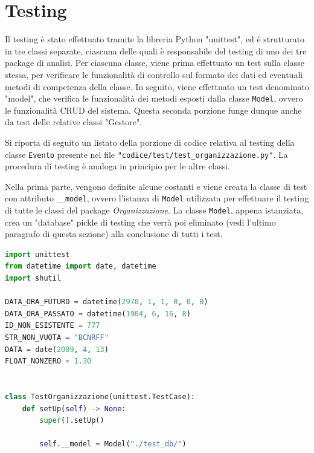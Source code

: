 \section{Testing}


	\lstset{style=mystyle}

Il testing è stato effettuato tramite la libreria Python "unittest", ed è strutturato in tre classi separate, ciascuna delle quali è responsabile del testing di uno dei tre package di analisi. Per ciascuna classe, viene prima effettuato un test sulla classe stessa, per verificare le funzionalità di controllo sul formato dei dati ed eventuali metodi di competenza della classe. In seguito, viene effettuato un test denominato "model", che verifica le funzionalità dei metodi esposti dalla classe \texttt{Model}, ovvero le funzionalità CRUD del sistema. Questa seconda porzione funge dunque anche da test delle relative classi "Gestore".

Si riporta di seguito un listato della porzione di codice relativa al testing della classe \texttt{Evento} presente nel file \texttt{"codice/test/test\_organizzazione.py"}. La procedura di testing è analoga in principio per le altre classi.

Nella prima parte, vengono definite alcune costanti e viene creata la classe di test con attributo \texttt{\_\_model}, ovvero l'istanza di \texttt{Model} utilizzata per effettuare il testing di tutte le classi del package \textit{Organizzazione}. La classe \texttt{Model}, appena istanziata, crea un "database" pickle di testing che verrà poi eliminato (vedi l'ultimo paragrafo di questa sezione) alla conclusione di tutti i test.

	\begin{lstlisting}[language=Python]
import unittest
from datetime import date, datetime
import shutil

DATA_ORA_FUTURO = datetime(2970, 1, 1, 0, 0, 0)
DATA_ORA_PASSATO = datetime(1904, 6, 16, 8)
ID_NON_ESISTENTE = 777
STR_NON_VUOTA = "BCNRFF"
DATA = date(2009, 4, 13)
FLOAT_NONZERO = 1.30


class TestOrganizzazione(unittest.TestCase):
    def setUp(self) -> None:
        super().setUp()

        self.__model = Model("./test_db/")
	\end{lstlisting}

